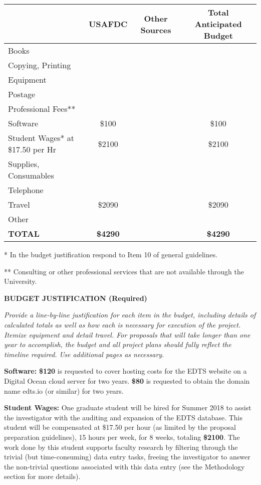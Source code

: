 \documentclass[10pt]{article}
\begin{document}
\begin{center}
\begin{tabular}{|l|c|c|c|}
  \hline
  & USAFDC & Other Sources & Total Anticipated Budget \\\hline
  Books &&& \\\hline
  Copying, Printing &&& \\\hline
  Equipment &&& \\\hline
  Postage &&& \\\hline
  Professional Fees** &&& \\\hline
  Software & \$100 && \$100 \\\hline
  \parbox{1.5in}{Student Wages*\\ at \$17.50 per Hr} & \$2100 && \$2100 \\\hline
  Supplies, Consumables &&& \\\hline
  Telephone &&& \\\hline
  Travel & \$2090 && \$2090 \\\hline
  Other &&& \\\hline\hline
  \textbf{TOTAL} & \textbf{\$4290} && \textbf{\$4290} \\\hline
\end{tabular}
\end{center}

* In the budget justification respond to Item 10 of general guidelines.

** Consulting or other professional services that are not available through the University.

\newpage




\centerline{\bf\Large
BUDGET JUSTIFICATION (Required)
}

\textit{Provide a line-by-line justification for each item in the budget, including details of calculated totals as well as how each is necessary for execution of the project.  Itemize equipment and detail travel. For proposals that will take longer than one year to accomplish, the budget and all project plans should fully reflect the timeline required.  Use additional pages as necessary.}\vspace{2em}

\textbf{Software:} \textbf{\$120} is requested to cover hosting costs for the EDTS website on a Digital Ocean cloud server for two years. \textbf{\$80} is requested to obtain the domain name edts.io (or similar) for two years.

\textbf{Student Wages:} One graduate student will be hired for Summer 2018 to assist the investigator with the auditing and expansion of the EDTS database. This student will be compensated at \$17.50 per hour (as limited by the proposal preparation guidelines), 15 hours per week, for 8 weeks, totaling \textbf{\$2100}. The work done by this student supports faculty research by filtering through the trivial (but time-consuming) data entry tasks, freeing the investigator to answer the non-trivial questions associated with this data entry (see the Methodology section for more details).
\end{document}
